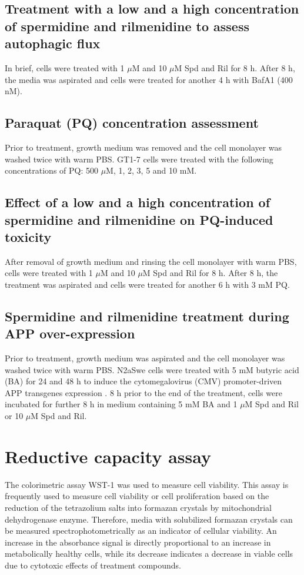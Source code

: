 \subsection{Treatment with a low and a high concentration of spermidine and rilmenidine to assess autophagic flux}\label{sec:Effect_low_high_Spd_Ril_autophagic flux}
In brief, cells were treated with 1 $\mu$M and 10 $\mu$M Spd and Ril for 8 h. After 8 h, the media was aspirated and cells were treated for another 4 h with BafA1 (400 nM).

\subsection{Paraquat (PQ) concentration assessment}
Prior to treatment, growth medium was removed and the cell monolayer was washed twice with warm PBS. GT1-7 cells were treated with the following concentrations of PQ: 500 $\mu$M, 1, 2, 3, 5 and 10 mM. 

\subsection{Effect of a low and a high concentration of spermidine and rilmenidine on PQ-induced toxicity}\label{sec:Effect_low_high_Spd_Ril_PQ_toxicity}
After removal of growth medium and rinsing the cell monolayer with warm PBS, cells were treated with 1 $\mu$M and 10 $\mu$M Spd and Ril for 8 h. After 8 h, the treatment was aspirated and cells were treated for another 6 h with 3 mM PQ. 

\subsection{Spermidine and rilmenidine treatment during APP over-expression}
Prior to treatment, growth medium was aspirated and the cell monolayer was washed twice with warm PBS. N2aSwe cells were treated with 5 mM butyric acid (BA) for 24 and 48 h to induce the cytomegalovirus (CMV) promoter-driven APP transgenes expression \citep{Yan2012,Ramalho2006}. 8 h prior to the end of the treatment, cells were incubated for further 8 h in medium containing 5 mM BA and 1 $\mu$M Spd and Ril or 10 $\mu$M Spd and Ril.

\section{Reductive capacity assay}
The colorimetric assay WST-1 was used to measure cell viability. This assay is frequently used to measure cell viability or cell proliferation based on the reduction of the tetrazolium salts into formazan crystals by mitochondrial dehydrogenase enzyme. Therefore, media with solubilized formazan crystals can be measured spectrophotometrically as an indicator of cellular viability. An increase in the absorbance signal is directly proportional to an increase in metabolically healthy cells, while its decrease indicates a decrease in viable cells due to cytotoxic effects of treatment compounds. 

